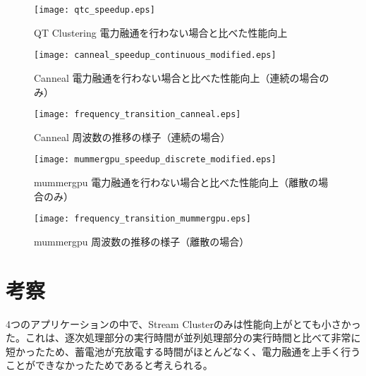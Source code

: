 \begin{figure}[t]
 \begin{center}
  \texttt{[image: qtc\_speedup.eps]}
 \end{center}
 \caption{QT Clustering 電力融通を行わない場合と比べた性能向上}
 \label{fig:qtclustering_speedup}
\end{figure}


\begin{figure}[t]
 \begin{center}
  \texttt{[image: canneal\_speedup\_continuous\_modified.eps]}
 \end{center}
 \caption{Canneal 電力融通を行わない場合と比べた性能向上（連続の場合のみ）}
 \label{fig:canneal_speedup_continuous}
\end{figure}

\begin{figure}[t]
 \begin{center}
  \texttt{[image: frequency\_transition\_canneal.eps]}
 \end{center}
 \caption{Canneal 周波数の推移の様子（連続の場合）}
 \label{fig:frequency_transition_canneal}
\end{figure}

\begin{figure}[t]
 \begin{center}
  \texttt{[image: mummergpu\_speedup\_discrete\_modified.eps]}
 \end{center}
 \caption{mummergpu 電力融通を行わない場合と比べた性能向上（離散の場合のみ）}
 \label{fig:mummergpu_speedup_discrete}
\end{figure}

\begin{figure}[t]
 \begin{center}
  \texttt{[image: frequency\_transition\_mummergpu.eps]}
 \end{center}
 \caption{mummergpu 周波数の推移の様子（離散の場合）}
 \label{fig:frequency_transition_mummergpu}
\end{figure}


\section{考察}
\label{sec:discussion}

4つのアプリケーションの中で、Stream Clusterのみは性能向上がとても小さかった。これは、逐次処理部分の実行時間が並列処理部分の実行時間と比べて非常に短かったため、蓄電池が充放電する時間がほとんどなく、電力融通を上手く行うことができなかったためであると考えられる。

